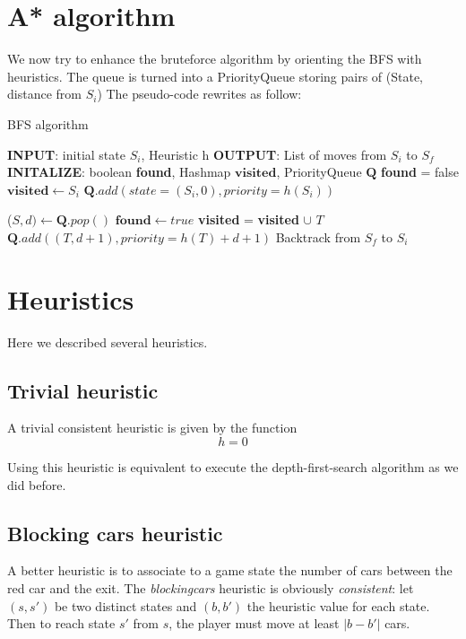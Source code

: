 \documentclass[10pt,a4paper]{article}
\begin{document}
\section{A* algorithm}

We now try to enhance the bruteforce algorithm by orienting the BFS with heuristics. The queue is turned into a PriorityQueue storing pairs of (State, distance from $S_i$)
The pseudo-code rewrites as follow:



\begin{algorithm}[H]
\caption{BFS algorithm}
\begin{algorithmic}
\STATE \textbf{INPUT}: initial state $S_i$, Heuristic h
\STATE \textbf{OUTPUT}: List of moves from $S_i$ to $S_f$
\STATE
\STATE \textbf{INITALIZE}:
\STATE boolean \textbf{found}, Hashmap $\textbf{visited}$, PriorityQueue  $\textbf{Q}$
\STATE \textbf{found} = false
\STATE $\textbf{visited} \leftarrow S_i$
\STATE $\textbf{Q}.add(state=(S_i,0),priority=h(S_i))$
\STATE

\STATE ($\textit{S},d) \leftarrow \textbf{Q}.pop()$
\STATE $\textbf{found}\leftarrow true$
\ENDIF
\STATE \textbf{visited} = \textbf{visited }$\cup$\textit{ $T$}
\STATE $\textbf{Q}.add((T, d+1), priority=h(T)+d+1)$
\ENDIF
\ENDFOR
\ENDWHILE 
\STATE
\STATE Backtrack from $S_f$ to $S_i$
\end{algorithmic}
\end{algorithm}


\section{Heuristics}

Here we described several heuristics.

\subsection{Trivial heuristic}
A trivial consistent heuristic is given by the function 
\[h = 0\]

Using this heuristic is equivalent to execute the depth-first-search algorithm as we did before.


\subsection{Blocking cars heuristic}
A better heuristic is to associate to a game state the number of cars between the red car and the exit. The \textit{blockingcars} heuristic is obviously \textit{consistent}: let $(s,s')$ be two distinct states and $(b,b')$ the heuristic value for each state. Then to reach state $s'$ from $s$, the player must move at least $|b - b'|$ cars.
\end{document}
